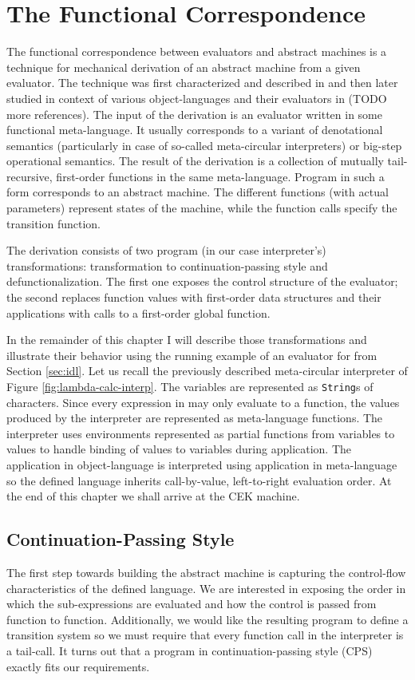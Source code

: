\chapter{The Functional Correspondence}\label{chapter:functional-correspondence}
The functional correspondence between evaluators and abstract machines is a technique for mechanical derivation of an abstract machine from a given evaluator.
The technique was first characterized and described in \cite{functional-correspondence} and then later studied in context of various object-languages and their evaluators in (TODO more references).
The input of the derivation is an evaluator written in some functional meta-language.
It usually corresponds to a variant of denotational semantics (particularly in case of so-called meta-circular interpreters) or big-step operational semantics.
The result of the derivation is a collection of mutually tail-recursive, first-order functions in the same meta-language.
Program in such a form corresponds to an abstract machine.
The different functions (with actual parameters) represent states of the machine, while the function calls specify the transition function.

The derivation consists of two program (in our case interpreter's) transformations: transformation to continuation-passing style and defunctionalization.
The first one exposes the control structure of the evaluator; the second replaces function values with first-order data structures and their applications with calls to a first-order global function.

In the remainder of this chapter I will describe those transformations and illustrate their behavior using the running example of an evaluator for \LC{} from Section \ref{sec:idl}.
Let us recall the previously described meta-circular interpreter of Figure \ref{fig:lambda-calc-interp}.
The variables are represented as \lstinline!String!s of characters.
Since every expression in \LC{} may only evaluate to a function, the values produced by the interpreter are represented as meta-language functions.
The interpreter uses environments represented as partial functions from variables to values to handle binding of values to variables during application.
The application in object-language is interpreted using application in meta-language so the defined language inherits call-by-value, left-to-right evaluation order.
At the end of this chapter we shall arrive at the CEK machine.

\section{Continuation-Passing Style}
The first step towards building the abstract machine is capturing the control-flow characteristics of the defined language.
We are interested in exposing the order in which the sub-expressions are evaluated and how the control is passed from function to function.
Additionally, we would like the resulting program to define a transition system so we must require that every function call in the interpreter is a tail-call.
It turns out that a program in continuation-passing style (CPS) exactly fits our requirements.


